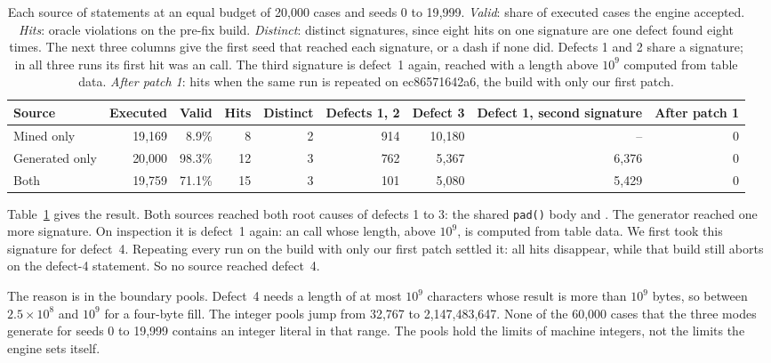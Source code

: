 \begin{table}[t]
  \caption{Each source of statements at an equal budget of 20{,}000 cases and
  seeds 0 to 19{,}999. \emph{Valid}: share of executed cases the engine
  accepted. \emph{Hits}: oracle violations on the pre-fix build. \emph{Distinct}:
  distinct signatures, since eight hits on one signature are one defect found
  eight times. The next three columns give the first seed that reached each
  signature, or a dash if none did. Defects 1 and 2 share a signature; in all
  three runs its first hit was an  call. The third signature is
  defect~1 again, reached with a length above $10^9$ computed from table data.
  \emph{After patch 1}: hits when the same run is repeated on ec86571642a6, the
  build with only our first patch.}
  \label{tab:ablation}
  \footnotesize
  \begin{tabular}{@{}lrrrrrrrr@{}}
    \toprule
    Source & Executed & Valid & Hits & Distinct & Defects 1, 2 & Defect 3 & Defect 1, second signature & After patch 1 \\
    \midrule
    Mined only     & 19{,}169 &  8.9\% &  8 & 2 & 914 & 10{,}180 & --       & 0 \\
    Generated only & 20{,}000 & 98.3\% & 12 & 3 & 762 & 5{,}367  & 6{,}376  & 0 \\
    Both           & 19{,}759 & 71.1\% & 15 & 3 & 101 & 5{,}080  & 5{,}429  & 0 \\
    \bottomrule
  \end{tabular}
\end{table}

Table~\ref{tab:ablation} gives the result. Both sources reached both root causes
of defects 1 to 3: the shared \texttt{pad()} body and . The generator
reached one more signature. On inspection it is defect~1 again: an 
call whose length, above $10^9$, is computed from table data. We first took this
signature for defect~4. Repeating every run on the build with only our first
patch settled it: all hits disappear, while that build still aborts on the
defect-4 statement. So no source reached defect~4.

The reason is in the boundary pools. Defect~4 needs a length of at most $10^9$
characters whose result is more than $10^9$ bytes, so between $2.5\times10^8$ and
$10^9$ for a four-byte fill. The integer pools jump from 32{,}767 to
2{,}147{,}483{,}647. None of the 60{,}000 cases that the three modes generate for
seeds 0 to 19{,}999 contains an integer literal in that range. The pools hold the limits of machine integers, not the
limits the engine sets itself.

